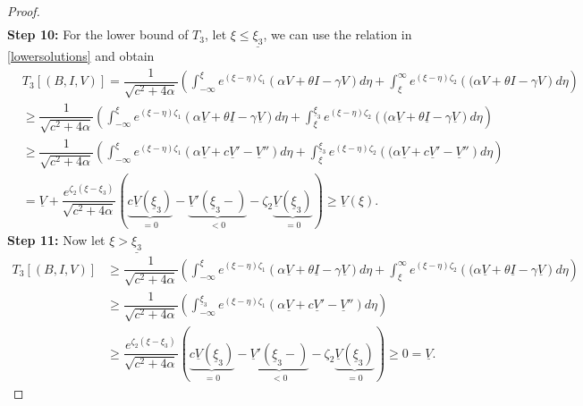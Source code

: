\documentclass[11pt]{article}
\theoremstyle{definition}
\begin{document}
{\begin{proof}
\begin{align}
\end{align}
\textbf{Step 10:} For the lower bound of $T_3$, let $\xi \le \underline{\xi_3}$, we can use the relation in \eqref{lowersolutions} and obtain
\begin{align}
       & T_3[(B,I,V)] = \dfrac{1}{\sqrt{c^2+4 \alpha }} \left( \int_{-\infty}^{\xi} e^{(\xi- \eta)\zeta_1} {\left(\alpha V+\theta I- \gamma V \right)}d \eta +  \int_{\xi}^{\infty} e^{(\xi- \eta)\zeta_2} {\left((\alpha V+\theta I- \gamma V\right)}d \eta \right)\\ 
     & \geq \dfrac{1}{\sqrt{c^2+4 \alpha}} \left( \int_{-\infty}^{\xi} e^{(\xi- \eta)\zeta_1} {\left(\alpha \underline{V}+ \theta \underline{I}- \gamma \underline{V} \right)}d \eta +  \int_{\xi}^{\underline{\xi}_3} e^{(\xi- \eta)\zeta_2} {\left((\alpha \underline{V}+ \theta \underline{I}- \gamma \underline{V}\right)}d \eta \right)\\ 
     & \geq \dfrac{1}{\sqrt{c^2+4 \alpha}} \left( \int_{-\infty}^{\xi} e^{(\xi- \eta)\zeta_1} {\left(\alpha \underline{V}+c\underline{V}'-\underline{V}'' \right)}d \eta +  \int_{\xi}^{\underline{\xi}_3} e^{(\xi- \eta)\zeta_2} {\left((\alpha \underline{V}+c\underline{V}'-\underline{V}''\right)}d \eta \right)  \\ & = \underline{V}+ \dfrac{e^{\zeta_2(\xi-\xi_3)}}{\sqrt{c^2+4 \alpha}}\left( \underbrace{c\underline{V}(\underline{\xi}_3)}_{=0}- \underbrace{\underline{V}'(\underline{\xi}_3-)}_{<0} - \zeta_2 \underbrace { {\underline{V}(\underline{\xi}_3)}}_{=0} \right) \ge \underline{V}(\xi).
    \end{align}
\textbf{Step 11: }Now let $\xi> \underline{\xi_3}$
\begin{align}
      T_3[(B,I,V)] &\geq \dfrac{1}{\sqrt{c^2+4 \alpha}} \left( \int_{-\infty}^{\xi} e^{(\xi- \eta)\zeta_1} {\left(\alpha \underline{V}+ \theta \underline{I}- \gamma \underline{V} \right)}d \eta +  \int_{\xi}^{\infty} e^{(\xi- \eta)\zeta_2} {\left((\alpha \underline{V}+ \theta \underline{I}- \gamma \underline{V}\right)}d \eta \right)\\& \geq \dfrac{1}{\sqrt{c^2+4 \alpha}} \left( \int_{-\infty}^{\underline{\xi}_3} e^{(\xi- \eta)\zeta_1} {\left(\alpha \underline{V}+c\underline{V}'-\underline{V}'' \right)}d \eta \right) \\ &\ge \dfrac{e^{\zeta_2(\xi-\xi_3)}}{\sqrt{c^2+4 \alpha}}\left( \underbrace{c\underline{V}(\underline{\xi}_3)}_{=0}- \underbrace{\underline{V}'(\underline{\xi}_3-)}_{<0} - \zeta_2 \underbrace { {\underline{V}(\underline{\xi}_3)}}_{=0} \right) \ge 0=\underline{V}.
\end{align}


\end{proof}}
\end{document}
